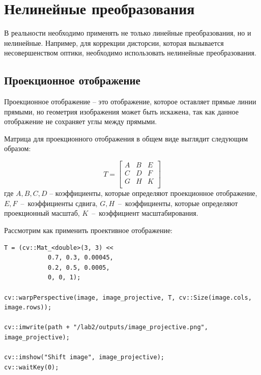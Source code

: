 \section{Нелинейные преобразования}

В реальности необходимо применять не только линейные преобразования, но и нелинейные.
Например, для коррекции дисторсии, которая вызывается несовершенством оптики, необходимо использовать нелинейные преобразования.

\subsection{Проекционное отображение}
Проекционное отображение -- это отображение, которое оставляет прямые линии прямыми, но геометрия изображения может быть искажена, так как 
данное отображение не сохраняет углы между прямыми.

Матрица для проекционного отображения в общем виде выглядит следующим образом:

\begin{equation}
T = \begin{bmatrix}
    A & B & E \\
    C & D & F \\
    G & H & K \\
\end{bmatrix}
\end{equation}
где $A, B, C, D$ -- коэффициенты, которые определяют проекционное отображение, $E, F$~--~коэффициенты сдвига, $G, H$~--~коэффициенты, которые определяют проекционный масштаб, $K$~--~коэффициент масштабирования.

Рассмотрим как применить проективное отображение:
\begin{lstlisting}[style=cpp_white, caption={Исходный код для проективного отображения}]
T = (cv::Mat_<double>(3, 3) << 
            0.7, 0.3, 0.00045, 
            0.2, 0.5, 0.0005,
            0, 0, 1); 

cv::warpPerspective(image, image_projective, T, cv::Size(image.cols, image.rows)); 

cv::imwrite(path + "/lab2/outputs/image_projective.png", image_projective);

cv::imshow("Shift image", image_projective); 
cv::waitKey(0); 
\end{lstlisting}

